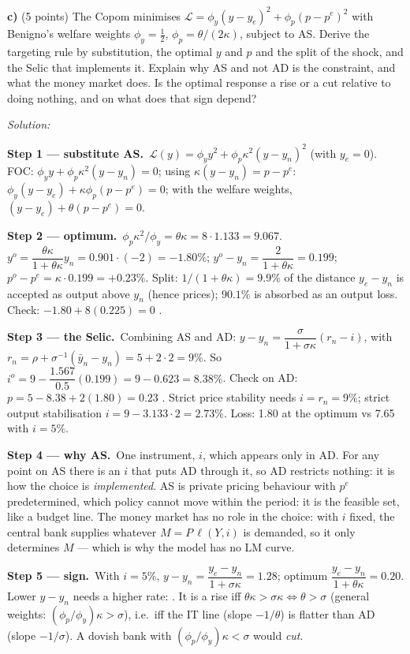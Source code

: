 \documentclass[11pt,a4paper]{article}
\newif\ifsolucoes
\newcommand{\espacoresol}{6.5cm}
\newcommand{\resolespaco}{\ifsolucoes\else\par\textit{Solution:}\vspace{\espacoresol}\par\fi}
\newcommand{\passo}[2]{\par\smallskip\noindent\textbf{Step #1.}~#2}
\begin{document}
\textbf{c)} (5 points) The Copom minimises $\mathcal L=\phi_y(y-y_e)^2+\phi_p(p-p^e)^2$ with Benigno's
welfare weights $\phi_y=\tfrac12$, $\phi_p=\theta/(2\kappa)$, subject to AS. Derive the targeting rule by
substitution, the optimal $y$ and $p$ and the split of the shock, and the Selic that implements it.
Explain why AS and not AD is the constraint, and what the money market does. Is the optimal response a
rise or a cut relative to doing nothing, and on what does that sign depend?
\resolespaco
\begin{sol}
\passo{1 --- substitute AS}{$\mathcal L(y)=\phi_y y^2+\phi_p\kappa^2(y-y_n)^2$ (with $y_e=0$).
FOC: $\phi_y y+\phi_p\kappa^2(y-y_n)=0$; using $\kappa(y-y_n)=p-p^e$:
$\boxed{\phi_y(y-y_e)+\kappa\phi_p(p-p^e)=0}$; with the welfare weights, $(y-y_e)+\theta(p-p^e)=0$.}
\passo{2 --- optimum}{$\phi_p\kappa^2/\phi_y=\theta\kappa=8\cdot1.133=9.067$.
$y^o=\dfrac{\theta\kappa}{1+\theta\kappa}y_n=0.901\cdot(-2)=\boxed{-1.80\%}$;
$y^o-y_n=\dfrac{2}{1+\theta\kappa}=0.199$; $p^o-p^e=\kappa\cdot0.199=\boxed{+0.23\%}$.
Split: $1/(1+\theta\kappa)=9.9\%$ of the distance $y_e-y_n$ is accepted as output above $y_n$ (hence
prices); $90.1\%$ is absorbed as an output loss. Check: $-1.80+8(0.225)=0$ \checkmark.}
\passo{3 --- the Selic}{Combining AS and AD: $y-y_n=\dfrac{\sigma}{1+\sigma\kappa}(r_n-i)$, with
$r_n=\rho+\sigma^{-1}(\bar y_n-y_n)=5+2\cdot2=9\%$. So
$i^o=9-\dfrac{1.567}{0.5}(0.199)=9-0.623=\boxed{8.38\%}$. Check on AD: $p=5-8.38+2(1.80)=0.23$ \checkmark.
Strict price stability needs $i=r_n=9\%$; strict output stabilisation $i=9-3.133\cdot2=2.73\%$.
Loss: 1.80 at the optimum vs 7.65 with $i=5\%$.}
\passo{4 --- why AS}{One instrument, $i$, which appears only in AD. For any point on AS there is an $i$
that puts AD through it, so AD restricts nothing: it is how the choice is \emph{implemented}. AS is
private pricing behaviour with $p^e$ predetermined, which policy cannot move within the period: it is
the feasible set, like a budget line. The money market has no role in the choice: with $i$ fixed, the
central bank supplies whatever $M=P\,\ell(Y,i)$ is demanded, so it only determines $M$ --- which is why
the model has no LM curve.}
\passo{5 --- sign}{With $i=5\%$, $y-y_n=\dfrac{y_e-y_n}{1+\sigma\kappa}=1.28$; optimum
$\dfrac{y_e-y_n}{1+\theta\kappa}=0.20$. Lower $y-y_n$ needs a higher rate:
\boxed{\text{a rise of }3.38\text{ pp}}. It is a rise iff $\theta\kappa>\sigma\kappa\iff\theta>\sigma$
(general weights: $(\phi_p/\phi_y)\kappa>\sigma$), i.e.\ iff the IT line (slope $-1/\theta$) is flatter
than AD (slope $-1/\sigma$). A dovish bank with $(\phi_p/\phi_y)\kappa<\sigma$ would \emph{cut}.}

\end{sol}
\end{document}
